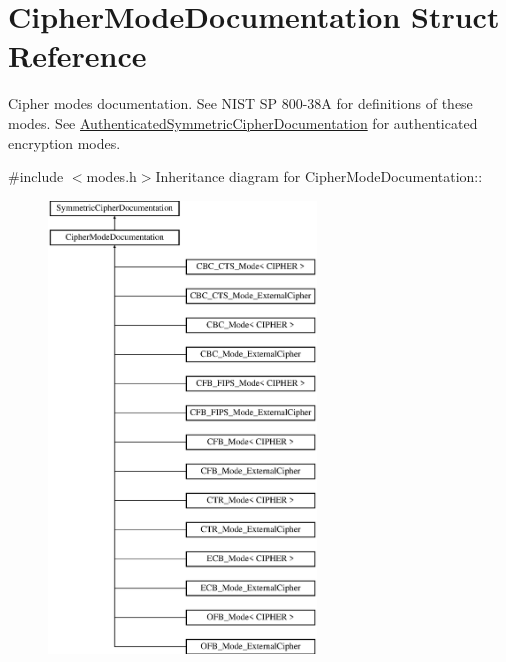 \hypertarget{struct_cipher_mode_documentation}{
\section{CipherModeDocumentation Struct Reference}
\label{struct_cipher_mode_documentation}
}


Cipher modes documentation. See NIST SP 800-\/38A for definitions of these modes. See \hyperlink{struct_authenticated_symmetric_cipher_documentation}{AuthenticatedSymmetricCipherDocumentation} for authenticated encryption modes.  


{\ttfamily \#include $<$modes.h$>$}Inheritance diagram for CipherModeDocumentation::\begin{figure}[H]
\begin{center}
\leavevmode
\includegraphics[height=12cm]{struct_cipher_mode_documentation}
\end{center}
\end{figure}


